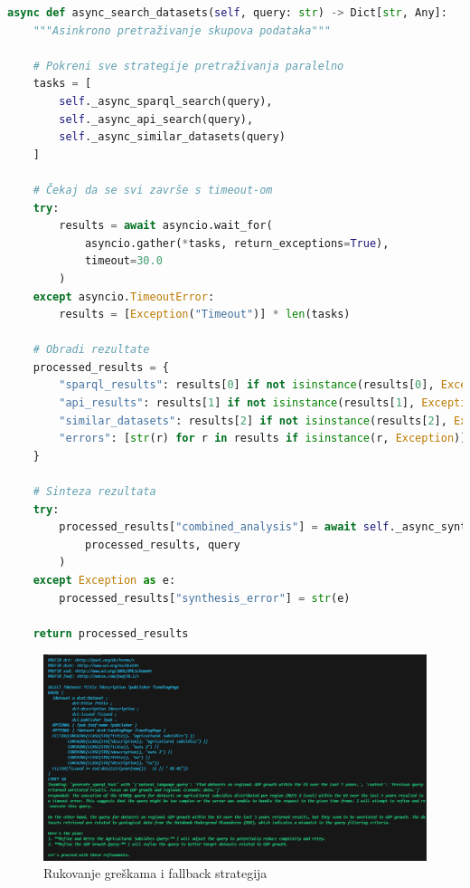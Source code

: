 \begin{lstlisting}[language=Python, caption=Implementacija asinkrone obrade]
async def async_search_datasets(self, query: str) -> Dict[str, Any]:
    """Asinkrono pretraživanje skupova podataka"""
    
    # Pokreni sve strategije pretraživanja paralelno
    tasks = [
        self._async_sparql_search(query),
        self._async_api_search(query),
        self._async_similar_datasets(query)
    ]
    
    # Čekaj da se svi završe s timeout-om
    try:
        results = await asyncio.wait_for(
            asyncio.gather(*tasks, return_exceptions=True),
            timeout=30.0
        )
    except asyncio.TimeoutError:
        results = [Exception("Timeout")] * len(tasks)
    
    # Obradi rezultate
    processed_results = {
        "sparql_results": results[0] if not isinstance(results[0], Exception) else [],
        "api_results": results[1] if not isinstance(results[1], Exception) else [],
        "similar_datasets": results[2] if not isinstance(results[2], Exception) else [],
        "errors": [str(r) for r in results if isinstance(r, Exception)]
    }
    
    # Sinteza rezultata
    try:
        processed_results["combined_analysis"] = await self._async_synthesize_results(
            processed_results, query
        )
    except Exception as e:
        processed_results["synthesis_error"] = str(e)
    
    return processed_results
\end{lstlisting}

\begin{figure}[htbp]
    \centering
    \includegraphics[width=1\textwidth]{figures/izvjestaj_image_68.png}
    \caption{Rukovanje greškama i fallback strategija}
    \label{fig:error_handling}
\end{figure} 


